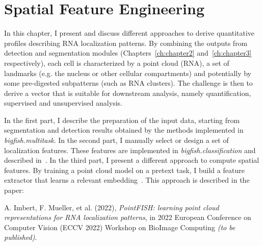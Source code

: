 
\graphicspath{{./figures/chapter4/}}

\chapter{Spatial Feature Engineering}
\label{ch:chapter4}

\minitoc
\newpage

In this chapter, I present and discuss different approaches to derive quantitative profiles describing \ac{RNA} localization patterns. By combining the outputs from detection and segmentation modules (Chapters~\ref{ch:chapter2} and~\ref{ch:chapter3} respectively), each cell is characterized by a point cloud (\ac{RNA}), a set of landmarks (e.g. the nucleus or other cellular compartments) and potentially by some pre-digested subpatterns (such as \ac{RNA} clusters). The challenge is then to derive a vector that is suitable for downstream analysis, namely quantification, supervised and unsupervised analysis. 



In the first part, I describe the preparation of the input data, starting from segmentation and detection results obtained by the methods implemented in \emph{bigfish.multitask}.
In the second part, I manually select or design a set of localization features.
These features are implemented in \emph{bigfish.classification} and described in~\cite{Imbert_fq_2022}.
In the third part, I present a different approach to compute spatial features.
By training a point cloud model on a pretext task, I build a feature extractor that learns a relevant embedding~\cite{pointfish_2022}.
This approach is described in the paper:

\begin{center}
	\color{green}
	A. Imbert, F. Mueller, et al. (2022), \textit{PointFISH: learning point cloud representations for RNA localization patterns}, in 2022 European Conference on Computer Vision (ECCV 2022) Workshop on BioImage Computing \textit{(to be published)}.
\end{center}

